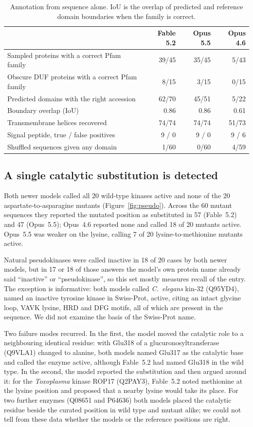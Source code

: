 \documentclass[11pt]{article}
\begin{document}
\begin{table}[ht]
\centering\small
\caption{Annotation from sequence alone. IoU is the overlap of predicted and reference domain boundaries
when the family is correct.}
\label{tab:feat}
\begin{tabular}{lrrr}
\toprule
 & Fable 5.2 & Opus 5.5 & Opus 4.6 \\
\midrule
Sampled proteins with a correct Pfam family & 39/45 & 35/45 & 5/43 \\
Obscure DUF proteins with a correct Pfam family & 8/15 & 3/15 & 0/15 \\
Predicted domains with the right accession & 62/70 & 45/51 & 5/22 \\
Boundary overlap (IoU) & 0.86 & 0.86 & 0.61 \\
Transmembrane helices recovered & 74/74 & 74/74 & 51/73 \\
Signal peptide, true / false positives & 9 / 0 & 9 / 0 & 9 / 6 \\
Shuffled sequences given any domain & 1/60 & 0/60 & 4/59 \\
\bottomrule
\end{tabular}
\end{table}

\subsection{A single catalytic substitution is detected}

Both newer models called all 20 wild-type kinases active and none of the 20 aspartate-to-asparagine
mutants (Figure~\ref{fig:pseudo}). Across the 60 mutant sequences they reported the mutated position as
substituted in 57 (Fable~5.2) and 47 (Opus~5.5); Opus~4.6 reported none and called 18 of 20 mutants
active. Opus~5.5 was weaker on the lysine, calling 7 of 20 lysine-to-methionine mutants active.

Natural pseudokinases were called inactive in 18 of 20 cases by both newer models, but in 17 or 18 of
those answers the model's own protein name already said ``inactive'' or ``pseudokinase'', so this set
mostly measures recall of the entry. The exception is informative: both models called \textit{C.~elegans}
kin-32 (Q95YD4), named an inactive tyrosine kinase in Swiss-Prot, active, citing an intact glycine loop,
VAVK lysine, HRD and DFG motifs, all of which are present in the sequence. We did not examine the basis of
the Swiss-Prot name.

Two failure modes recurred. In the first, the model moved the catalytic role to a neighbouring identical
residue: with Glu318 of a glucuronosyltransferase (Q9VLA1) changed to alanine, both models named Glu317
as the catalytic base and called the enzyme active, although Fable~5.2 had named Glu318 in the wild type.
In the second, the model reported the substitution and then argued around it: for the
\textit{Toxoplasma} kinase ROP17 (Q2PAY3), Fable~5.2 noted methionine at the lysine position and proposed
that a nearby lysine would take its place. For two further enzymes (Q08651 and P64636) both models placed
the catalytic residue beside the curated position in wild type and mutant alike; we could not tell from
these data whether the models or the reference positions are right.
\end{document}
